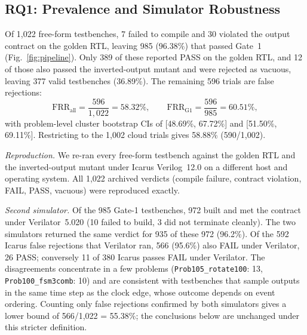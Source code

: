 \documentclass[conference]{IEEEtran}
\begin{document}
\subsection{RQ1: Prevalence and Simulator Robustness}
Of 1,022 free-form testbenches, 7 failed to compile and 30 violated the output contract on the golden RTL, leaving 985 (96.38\%) that passed Gate~1 (Fig.~\ref{fig:pipeline}). Only 389 of these reported PASS on the golden RTL, and 12 of those also passed the inverted-output mutant and were rejected as vacuous, leaving 377 valid testbenches (36.89\%). The remaining 596 trials are false rejections:
\begin{equation}
\text{FRR}_{\text{all}} = \frac{596}{1{,}022} = 58.32\%, \qquad \text{FRR}_{\text{G1}} = \frac{596}{985} = 60.51\%,
\end{equation}
with problem-level cluster bootstrap CIs of [48.69\%, 67.72\%] and [51.50\%, 69.11\%]. Restricting to the 1,002 cloud trials gives 58.88\% (590/1,002).

\textit{Reproduction.} We re-ran every free-form testbench against the golden RTL and the inverted-output mutant under Icarus Verilog~12.0 on a different host and operating system. All 1,022 archived verdicts (compile failure, contract violation, FAIL, PASS, vacuous) were reproduced exactly.

\textit{Second simulator.} Of the 985 Gate-1 testbenches, 972 built and met the contract under Verilator~5.020 (10 failed to build, 3 did not terminate cleanly). The two simulators returned the same verdict for 935 of these 972 (96.2\%). Of the 592 Icarus false rejections that Verilator ran, 566 (95.6\%) also FAIL under Verilator, 26 PASS; conversely 11 of 380 Icarus passes FAIL under Verilator. The disagreements concentrate in a few problems (\texttt{Prob105\_rotate100}: 13, \texttt{Prob100\_fsm3comb}: 10) and are consistent with testbenches that sample outputs in the same time step as the clock edge, whose outcome depends on event ordering. Counting only false rejections confirmed by both simulators gives a lower bound of 566/1,022 = 55.38\%; the conclusions below are unchanged under this stricter definition.
\end{document}
